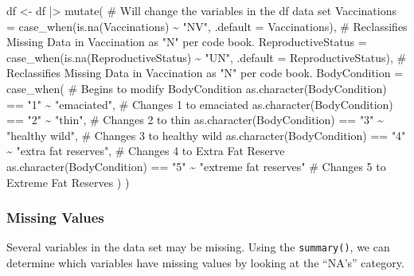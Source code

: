 \documentclass[
  letterpaper,
]{report}
\newenvironment{Shaded}{\begin{snugshade}}{\end{snugshade}}
\newcommand{\AttributeTok}[1]{\textcolor[rgb]{0.40,0.45,0.13}{#1}}
\newcommand{\CommentTok}[1]{\textcolor[rgb]{0.37,0.37,0.37}{#1}}
\newcommand{\FunctionTok}[1]{\textcolor[rgb]{0.28,0.35,0.67}{#1}}
\newcommand{\NormalTok}[1]{\textcolor[rgb]{0.00,0.23,0.31}{#1}}
\newcommand{\OtherTok}[1]{\textcolor[rgb]{0.00,0.23,0.31}{#1}}
\newcommand{\SpecialCharTok}[1]{\textcolor[rgb]{0.37,0.37,0.37}{#1}}
\newcommand{\StringTok}[1]{\textcolor[rgb]{0.13,0.47,0.30}{#1}}
\begin{document}
\begin{Shaded}
\begin{Highlighting}[]
\NormalTok{df }\OtherTok{\textless{}{-}}\NormalTok{ df }\SpecialCharTok{|\textgreater{}} \FunctionTok{mutate}\NormalTok{( }\CommentTok{\# Will change the variables in the df data set}
    \AttributeTok{Vaccinations =} \FunctionTok{case\_when}\NormalTok{(}\FunctionTok{is.na}\NormalTok{(Vaccinations) }\SpecialCharTok{\textasciitilde{}} \StringTok{"NV"}\NormalTok{, }\AttributeTok{.default =}\NormalTok{ Vaccinations), }\CommentTok{\# Reclassifies Missing Data in Vaccination as "N" per code book.}
    \AttributeTok{ReproductiveStatus =} \FunctionTok{case\_when}\NormalTok{(}\FunctionTok{is.na}\NormalTok{(ReproductiveStatus) }\SpecialCharTok{\textasciitilde{}} \StringTok{"UN"}\NormalTok{, }\AttributeTok{.default =}\NormalTok{ ReproductiveStatus), }\CommentTok{\# Reclassifies Missing Data in Vaccination as "N" per code book.}
    \AttributeTok{BodyCondition =} \FunctionTok{case\_when}\NormalTok{( }\CommentTok{\# Begins to modify BodyCondition}
        \FunctionTok{as.character}\NormalTok{(BodyCondition) }\SpecialCharTok{==} \StringTok{"1"} \SpecialCharTok{\textasciitilde{}} \StringTok{"emaciated"}\NormalTok{, }\CommentTok{\# Changes 1 to emaciated}
        \FunctionTok{as.character}\NormalTok{(BodyCondition) }\SpecialCharTok{==} \StringTok{"2"} \SpecialCharTok{\textasciitilde{}} \StringTok{"thin"}\NormalTok{, }\CommentTok{\# Changes 2 to thin}
        \FunctionTok{as.character}\NormalTok{(BodyCondition) }\SpecialCharTok{==} \StringTok{"3"} \SpecialCharTok{\textasciitilde{}} \StringTok{"healthy wild"}\NormalTok{, }\CommentTok{\# Changes 3 to healthy wild }
        \FunctionTok{as.character}\NormalTok{(BodyCondition) }\SpecialCharTok{==} \StringTok{"4"} \SpecialCharTok{\textasciitilde{}} \StringTok{"extra fat reserves"}\NormalTok{, }\CommentTok{\# Changes 4 to Extra Fat Reserve}
        \FunctionTok{as.character}\NormalTok{(BodyCondition) }\SpecialCharTok{==} \StringTok{"5"} \SpecialCharTok{\textasciitilde{}} \StringTok{"extreme fat reserves"} \CommentTok{\# Changes 5 to Extreme Fat Reserves}
\NormalTok{        )}
\NormalTok{    )}
\end{Highlighting}
\end{Shaded}

\subsubsection{Missing Values}\label{missing-values}

Several variables in the data set may be missing. Using the
\texttt{summary()}, we can determine which variables have missing values
by looking at the ``NA's'' category.
\end{document}
